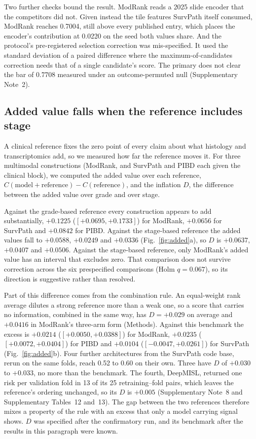 \documentclass[pdflatex,sn-nature]{sn-jnl}
\begin{document}
Two further checks bound the result. ModRank reads a 2025 slide encoder that the competitors did not.
Given instead the tile features SurvPath itself consumed, ModRank reaches 0.7004, still above every
published entry, which places the encoder's contribution at 0.0220 on the seed both values share.
And the protocol's
pre-registered selection correction was mis-specified. It used the standard deviation of a paired
difference where the maximum-of-candidates correction needs that of a single candidate's score. The primary does not clear the bar of 0.7708 measured under an outcome-permuted null (Supplementary
Note~2).

\subsection*{Added value falls when the reference includes stage}

A clinical reference fixes the zero point of every claim about what histology and transcriptomics
add, so we measured how far the reference moves it. For three multimodal constructions (ModRank, and
SurvPath and PIBD each given the clinical block), we computed the added value over each reference,
$C(\text{model} + \text{reference}) - C(\text{reference})$, and the inflation $D$, the difference
between the added value over grade and over stage.

Against the grade-based reference every construction appears to add substantially, $+0.1225$
($[+0.0695, +0.1733]$) for ModRank, $+0.0656$ for SurvPath and $+0.0842$ for PIBD. Against the stage-based
reference the added values fall to $+0.0588$, $+0.0249$ and $+0.0336$
(Fig.~\ref{fig:added}a), so $D$ is $+0.0637$, $+0.0407$ and $+0.0506$. Against the
stage-based reference, only ModRank's added value has an interval that excludes zero. That comparison
does not survive correction across the six prespecified comparisons (Holm $q=0.067$), so its
direction is suggestive rather than resolved.

Part of this difference comes from the combination rule. An equal-weight rank average dilutes a strong reference more than a
weak one, so a score that carries no information, combined in the same way, has $D = +0.029$ on
average and $+0.0416$ in ModRank's three-arm form (Methods). Against this benchmark the excess is
$+0.0214$ ($[+0.0050, +0.0388]$) for ModRank, $+0.0235$ ($[+0.0072, +0.0404]$) for PIBD and
$+0.0104$ ($[-0.0047, +0.0261]$) for SurvPath (Fig.~\ref{fig:added}b). Four further architectures
from the SurvPath code base, rerun on the same folds, reach 0.52 to 0.60 on their own. Three have
$D$ of $+0.030$ to $+0.033$, no more than the benchmark. The fourth, DeepMISL, returned one risk per
validation fold in 13 of its 25 retraining--fold pairs, which leaves the reference's ordering
unchanged, so its $D$ is $+0.005$ (Supplementary Note~8 and Supplementary Tables~12 and~13). The gap between the two references therefore mixes a property of the rule with an excess
that only a model carrying signal shows. $D$ was specified after the
confirmatory run, and its benchmark after the results in this paragraph were known.
\end{document}
